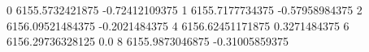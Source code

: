 0 6155.5732421875 -0.72412109375
1 6155.7177734375 -0.57958984375
2 6156.09521484375 -0.2021484375
4 6156.62451171875 0.3271484375
6 6156.29736328125 0.0
8 6155.9873046875 -0.31005859375
